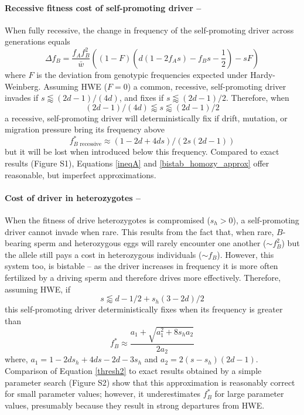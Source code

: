\documentclass{pnastwo}
\begin{document}
\begin{article}
\paragraph{Recessive fitness cost of self-promoting driver -- }
When fully recessive, the change in frequency of the self-promoting driver across generations equals 
\begin{equation}
\Delta f_B=\frac{f_A f_B^2}{\bar{w}} \left( \left(1-F\right)\left( d\left(1-2 f_A s\right) - f_B s-\frac{1}{2}\right) - s  F \right)
\label{deltadriver}
\end{equation}
where $F$ is the deviation from genotypic frequencies expected under Hardy-Weinberg. 
Assuming HWE  ($F=0$) a common, recessive, self-promoting driver invades if $s\lessapprox(2 d - 1)/(4 d)$, and fixes if
 $s\lessapprox(2d-1)/2$. 
 Therefore, when 
\begin{equation}
(2 d - 1)/(4 d)  \lessapprox  s  \lessapprox  (2d-1)/2\label{ineqA}
\end{equation} 
a recessive, self-promoting driver will deterministically fix if drift,
 	mutation, or migration pressure bring its frequency above
\begin{equation} 
f^*_{B\text{ recessive}} \approx (1-2d+4ds)/(2s(2d-1)) \label{bistab_homozy_approx}
\end{equation}
 but it will be lost when introduced below this frequency. 
 Compared to exact results (Figure S1), Equations
 \eqref{ineqA} and \eqref{bistab_homozy_approx} offer reasonable, but imperfect approximations. 
 
 
 \paragraph{Cost of driver in heterozygotes -- } 
When the fitness of drive heterozygotes is compromised ($s_h>0$), a self-promoting driver cannot invade when rare.
This results from the fact that,
when rare, 
$B$-bearing sperm and heterozygous eggs will rarely encounter one another ($\sim f_B^2$) but the allele still pays a
cost in heterozygous individuals ($\sim f_B$). 
However, this system too, is bistable -- as the driver increases in frequency it is more often fertilized by a driving sperm and therefore drives more effectively. 
Therefore, assuming HWE, if 
\begin{equation}
	s \lessapprox  d -1/2 +s_h(3-2d)/2
	\label{sForHetFix}
\end{equation}
this self-promoting driver deterministically fixes when its frequency is greater than
\begin{equation}
	f_B^* \approx \frac{a_1+\sqrt{a_1^2+8 s_h a_2}}{2 a_2}
	\label{thresh2}
\end{equation}
where, $a_1=1-2 ds_h+4 d s-2 d-3 s_h$ and $a_2=2(s-s_h)(2d-1)$.
Comparison of Equation \ref{thresh2} to exact results obtained by a
simple parameter search (Figure S2)
show that this approximation is reasonably correct for small
parameter values; however, it underestimates $f_B^*$ for large parameter values, presumably because they result in strong departures from HWE.



\end{article}
\end{document}
